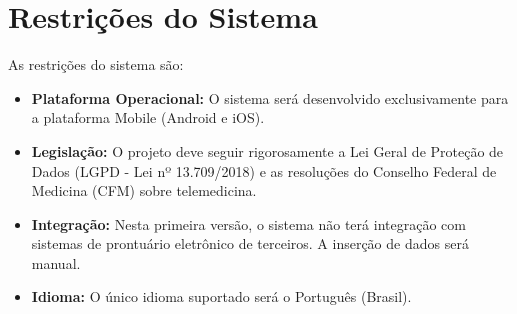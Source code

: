 \documentclass[12pt, a4paper, oneside]{abntex2}
\begin{document}
\section{Restrições do Sistema}
\label{sec:restricoes}
As restrições do sistema são:
\begin{itemize}
    \item \textbf{Plataforma Operacional:} O sistema será desenvolvido exclusivamente para a plataforma Mobile (Android e iOS).
    \item \textbf{Legislação:} O projeto deve seguir rigorosamente a Lei Geral de Proteção de Dados (LGPD - Lei nº 13.709/2018) e as resoluções do Conselho Federal de Medicina (CFM) sobre telemedicina.
    \item \textbf{Integração:} Nesta primeira versão, o sistema não terá integração com sistemas de prontuário eletrônico de terceiros. A inserção de dados será manual.
    \item \textbf{Idioma:} O único idioma suportado será o Português (Brasil).
\end{itemize}

\postextual


\end{document}
